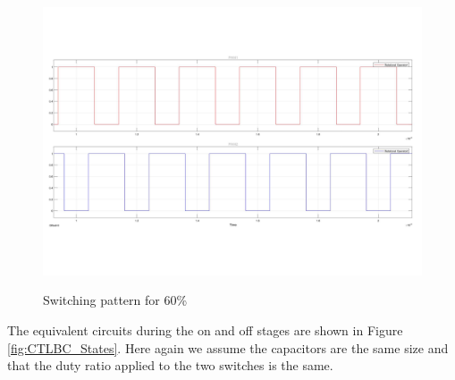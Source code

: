 \begin{figure}[H]%
    \centering
    {{\includegraphics[width=\textwidth]{figures/dConventionalThreeLevelBC/PWMCompare.pdf} }}%
    \caption{Switching pattern for 60\%}%
     \label{fig:PWM12}%
\end{figure}
The equivalent circuits during the on and off stages are shown in Figure \ref{fig:CTLBC_States}. Here again we assume the capacitors are the same size and that the duty ratio applied to the two switches is the same. 
\vspace{-5mm}
